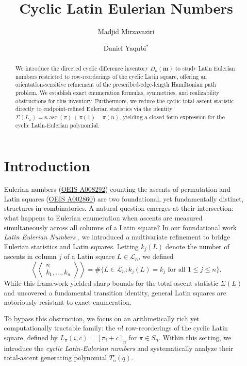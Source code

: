 \documentclass[11pt,a4paper]{amsart}
\title[Cyclic Latin Eulerian Numbers]{Cyclic Latin Eulerian Numbers}
\author{Madjid Mirzavaziri}
\author{Daniel Yaqubi$^{*}$}
\newcommand{\1}{\mathbf{1}}
\newcommand{\LE}[1]{\left\langle\!\!\left\langle #1 \right\rangle\!\!\right\rangle}
\begin{document}
\begin{abstract}
We introduce the directed cyclic difference inventory $D_n(\mathbf{m})$ to study Latin Eulerian numbers restricted to row-reorderings of the cyclic Latin square, offering an orientation-sensitive refinement of the prescribed-edge-length Hamiltonian path problem. We establish exact enumeration formulas, symmetries, and realizability obstructions for this inventory. Furthermore, we reduce the cyclic total-ascent statistic directly to endpoint-refined Eulerian statistics via the identity $\Sigma(L_\pi) = n \operatorname{asc}(\pi) + \pi(1) - \pi(n)$, yielding a closed-form expression for the cyclic Latin-Eulerian polynomial.
\end{abstract}
\maketitle

\section{Introduction}

Eulerian numbers (\href{https://oeis.org/A008292}{OEIS A008292}) counting the ascents of permutation and Latin squares (\href{https://oeis.org/A002860}{OEIS A002860}) are two foundational, yet fundamentally distinct, structures in combinatorics. A natural question emerges at their intersection: what happens to Eulerian enumeration when ascents are measured simultaneously across all columns of a Latin square? 
In our foundational work \emph{Latin Eulerian Numbers} \cite{LEN}, we introduced a multivariate refinement to bridge Eulerian statistics and Latin squares. Letting $k_j(L)$ denote the number of ascents in column $j$ of a Latin square $L \in \mathcal{L}_n$, we defined
\begin{equation}
    \LE{\begin{matrix}n\\ k_{1},\dots,k_{n}\end{matrix}} = \#\{L \in \mathcal{L}_{n} : k_{j}(L) = k_{j} \text{ for all } 1 \le j \le n \}.
\end{equation}
While this framework yielded sharp bounds for the total-ascent statistic $\Sigma(L)$ and uncovered a fundamental transition identity, general Latin squares are notoriously resistant to exact enumeration. 

To bypass this obstruction, we focus on an arithmetically rich yet computationally tractable family: the $n!$ row-reorderings of the cyclic Latin square, defined by $L_\pi(i,c)=[\pi_i+c]_n$ for $\pi \in S_n$. Within this setting, we introduce the \emph{cyclic Latin-Eulerian numbers} and systematically analyze their total-ascent generating polynomial $T_n^c(q)$.
\end{document}
